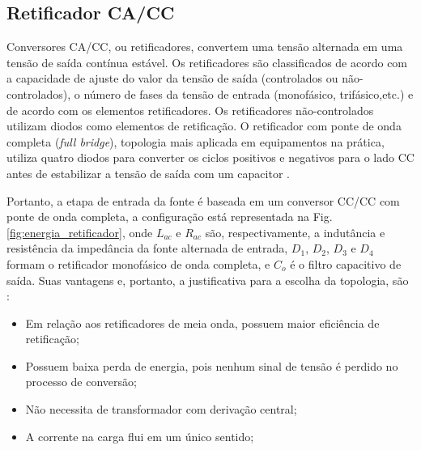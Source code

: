 \subsection{Retificador CA/CC}


Conversores CA/CC, ou retificadores, convertem uma tensão alternada em uma tensão de saída contínua estável. Os retificadores são classificados de acordo com a capacidade de ajuste do valor da tensão de saída (controlados ou não-controlados), o número de fases da tensão de entrada (monofásico, trifásico,etc.) e de acordo com os elementos retificadores. Os retificadores não-controlados utilizam diodos como elementos de retificação. O retificador com ponte de onda completa (\textit{full bridge}), topologia mais aplicada em equipamentos na prática, utiliza quatro diodos para converter os ciclos positivos e negativos para o lado CC antes de estabilizar a tensão de saída com um capacitor \cite{Conversores,Conversores2}. 

Portanto, a etapa de entrada da fonte é baseada em um conversor CC/CC com ponte de onda completa, a configuração está representada na Fig. \ref{fig:energia_retificador}, onde $L_{ac}$ e $R_{ac}$ são, respectivamente, a indutância e resistência da impedância da fonte alternada de entrada, $D_{1}$, $D_{2}$, $D_{3}$ e $D_{4}$ formam o retificador monofásico de onda completa, e $C_{o}$ é o filtro capacitivo de saída. Suas vantagens e, portanto, a justificativa para a escolha da topologia, são \cite{retificador}:

\begin{itemize}
    \item Em relação aos retificadores de meia onda, possuem maior eficiência de retificação;
    
    \item Possuem baixa perda de energia, pois nenhum sinal de tensão é perdido no processo de conversão;
    
    \item Não necessita de transformador com derivação central;
    
    \item A corrente na carga flui em um único sentido;
\end{itemize}


